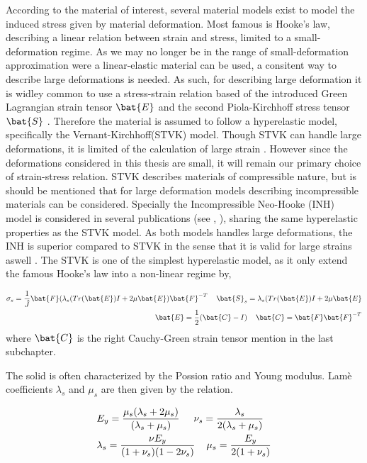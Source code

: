According to the material of interest, several material models exist to model the induced stress given by material deformation. Most famous is Hooke's law, describing a linear relation between strain and stress, limited to a small-deformation regime. As we may no longer be in the range of small-deformation approximation were a linear-elastic material can be used, a consitent way to describe large deformations is needed. As such, for describing large deformation it is widley common to use a stress-strain relation based of the introduced Green Lagrangian strain tensor $\bat{E}$ and the second Piola-Kirchhoff stress tensor $\bat{S}$ \cite{Razzaq2010}. Therefore the material is assumed to follow a hyperelastic model, specifically the Vernant-Kirchhoff(STVK) model. Though STVK can handle large deformations, it is limited of the calculation of large strain \cite{Razzaq2010}. However since the deformations considered in this thesis are small, it will remain our primary choice of strain-stress relation.  STVK describes materials of compressible nature,  but is should be mentioned that for large deformation models describing incompressible materials can be considered. Specially the Incompressible Neo-Hooke (INH) model is considered in several publications (see \cite{Wick2013}, \cite{Richter2010c}), sharing the same hyperelastic properties as the STVK model. As both models handles large deformations, the INH is superior compared to STVK in the sense that it is valid for large strains aswell \cite{Razzaq2010}. \newpage
The STVK is one of the simplest hyperelastic model, as it only extend the famous Hooke's law into a non-linear regime by,

\begin{align*}
\sigma_s = \frac{1}{\hat{J}} \bat{F}(\lambda_s(Tr(\bat{E}) I + 2 \mu \bat{E})\bat{F}^{-T} \hspace{4mm}
\bat{S}_s = \lambda_s(Tr(\bat{E}) I + 2 \mu \bat{E} \\
\bat{E} = \frac{1}{2}(\bat{C} - I ) \hspace{4mm} \bat{C} = \bat{F}\bat{F}^{-T}
\end{align*} 
 where $\bat{C}$ is the right Cauchy-Green strain tensor mention in the last subchapter. 
  
 The solid is often characterized by the Possion ratio and Young modulus. Lamè coefficients  $\lambda_s$ and $\mu_s$ are then given by the relation.

\begin{align*}
&E_y = \frac{ \mu_s ( \lambda_s + 2 \mu_s) }{ ( \lambda_s + \mu_s ) } 
\hspace{5mm} \nu_s = \frac{\lambda_s}{2(\lambda_s + \mu_s)} \\
&\lambda_s = \frac{\nu E_y}{(1 + \nu_s)(1 - 2\nu_s)} \hspace{4mm} \mu_s = \frac{E_y}{2(1 + \nu_s)} 
\end{align*}

